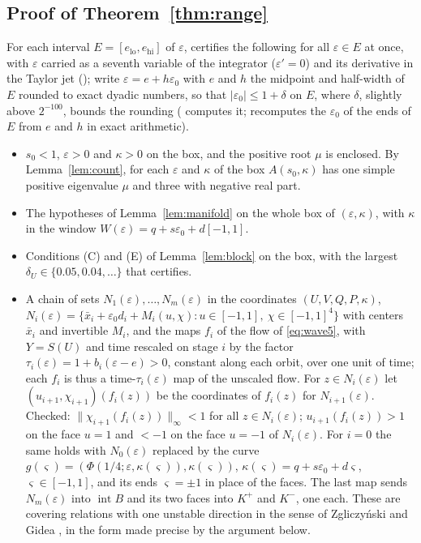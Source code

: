\documentclass[11pt]{article}
\theoremstyle{definition}
\newcommand{\eps}{\varepsilon}
\begin{document}
\subsection{Proof of Theorem~\ref{thm:range}}\label{sec:proof-range}

For each interval $E = [e_{\mathrm{lo}}, e_{\mathrm{hi}}]$ of $\eps$,  certifies the following for all $\eps \in E$ at once, with $\eps$ carried as a seventh variable of the integrator ($\eps' = 0$) and its derivative in the Taylor jet (); write $\eps = e + h\eps_0$ with $e$ and $h$ the midpoint and half-width of $E$ rounded to exact dyadic numbers, so that $|\eps_0| \le 1 + \delta$ on $E$, where $\delta$, slightly above $2^{-100}$, bounds the rounding ( computes it;  recomputes the $\eps_0$ of the ends of $E$ from $e$ and $h$ in exact arithmetic).
\begin{itemize}
\item[(R)] $s_0 < 1$, $\eps > 0$ and $\kappa > 0$ on the box, and the positive root $\mu$ is enclosed. By Lemma~\ref{lem:count}, for each $\eps$ and $\kappa$ of the box $A(s_0, \kappa)$ has one simple positive eigenvalue $\mu$ and three with negative real part.
\item[(M)] The hypotheses of Lemma~\ref{lem:manifold} on the whole box of $(\eps, \kappa)$, with $\kappa$ in the window $W(\eps) = q + s\eps_0 + d[-1, 1]$.
\item[(B)] Conditions (C) and (E) of Lemma~\ref{lem:block} on the box, with the largest $\delta_U \in \{0.05, 0.04, \dots\}$ that certifies.
\item[(Cov)] A chain of sets $N_1(\eps), \dots, N_m(\eps)$ in the coordinates $(U, V, Q, P, \kappa)$, $N_i(\eps) = \{\bar x_i + \eps_0 d_i + M_i(u, \chi) : u \in [-1, 1],\ \chi \in [-1, 1]^4\}$ with centers $\bar x_i$ and invertible $M_i$, and the maps $f_i$ of the flow of \eqref{eq:wave5}, with $Y = S(U)$ and time rescaled on stage $i$ by the factor $\tau_i(\eps) = 1 + b_i(\eps - e) > 0$, constant along each orbit, over one unit of time; each $f_i$ is thus a time-$\tau_i(\eps)$ map of the unscaled flow. For $z \in N_i(\eps)$ let $(u_{i+1}, \chi_{i+1})(f_i(z))$ be the coordinates of $f_i(z)$ for $N_{i+1}(\eps)$. Checked: $\|\chi_{i+1}(f_i(z))\|_\infty < 1$ for all $z \in N_i(\eps)$; $u_{i+1}(f_i(z)) > 1$ on the face $u = 1$ and $< -1$ on the face $u = -1$ of $N_i(\eps)$. For $i = 0$ the same holds with $N_0(\eps)$ replaced by the curve $g(\varsigma) = (\Phi(1/4; \eps, \kappa(\varsigma)), \kappa(\varsigma))$, $\kappa(\varsigma) = q + s\eps_0 + d\varsigma$, $\varsigma \in [-1, 1]$, and its ends $\varsigma = \pm1$ in place of the faces. The last map sends $N_m(\eps)$ into $\operatorname{int} B$ and its two faces into $K^+$ and $K^-$, one each. These are covering relations with one unstable direction in the sense of Zgliczy\'nski and Gidea \cite{zg2004}, in the form made precise by the argument below.
\end{itemize}
\end{document}
